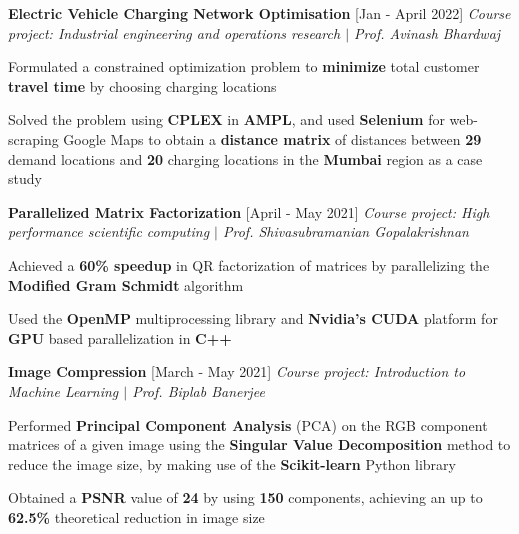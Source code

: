 \documentclass[10pt]{article}
\newcommand{\smallbullet}{
    \small$\bullet$
}
\newcommand{\bigblock}[3]{
    {
        \vspace*{3pt}
        \hspace*{-7pt} {\large{\textbf{#1}}} \hfill #2 \newline
        \textit{\textsf{#3}}
    }
}
\newenvironment{bullet-list-minor}{
    \begin{list}{
        \smallbullet
    }{
        \setlength\leftmargin{15pt}\topsep -6pt \itemsep -5pt
    }
} {
    \end{list}
}
\begin{document}
    \bigblock{
        Electric Vehicle Charging Network Optimisation
    }{
        [Jan - April 2022]
    }{
        Course project: Industrial engineering and operations research \(|\) Prof. Avinash Bhardwaj
    }
	\begin{bullet-list-minor}
        \item Formulated a constrained optimization problem to \textbf{minimize} total customer \textbf{travel time} by choosing charging locations
        \item Solved the problem using \textbf{CPLEX} in \textbf{AMPL}, and used \textbf{Selenium} for web-scraping Google Maps to obtain a \textbf{distance matrix} of distances between \textbf{29} demand locations and \textbf{20} charging locations in the \textbf{Mumbai} region as a case study
    \end{bullet-list-minor}

    \bigblock{
        Parallelized Matrix Factorization
    }{
        [April - May 2021]
    }{
        Course project: High performance scientific computing \(|\) Prof. Shivasubramanian Gopalakrishnan
    }
	\begin{bullet-list-minor}
        \item Achieved a \textbf{60\% speedup} in QR factorization of matrices by parallelizing the \textbf{Modified Gram Schmidt} algorithm
        \item Used the \textbf{OpenMP} multiprocessing library and \textbf{Nvidia's CUDA} platform for \textbf{GPU} based parallelization in \textbf{C++}
    \end{bullet-list-minor}

    \bigblock{
        Image Compression
    }{
        [March - May 2021]
    }{
        Course project: Introduction to Machine Learning \(|\) Prof. Biplab Banerjee
    }
	\begin{bullet-list-minor}
        \item Performed \textbf{Principal Component Analysis} (PCA) on the RGB component matrices of a given image using the \textbf{Singular Value Decomposition} method to reduce the image size, by making use of the \textbf{Scikit-learn} Python library
        \item Obtained a \textbf{PSNR} value of \textbf{24} by using \textbf{150} components, achieving an up to \textbf{62.5\%} theoretical reduction in image size
    \end{bullet-list-minor}
\end{document}
